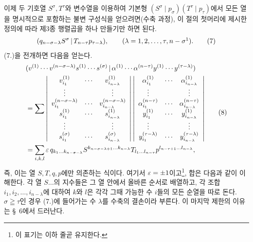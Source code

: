 이제 두 기호열 $S^\sigma,T^\tau$와 변수열을 이용하여 기본형 $(S^\sigma\mid p_\sigma)(T^\tau\mid p_\tau)$에서 모든 열을 명시적으로 포함하는 불변 구성식을 얻으려면(수축 과정), 이 절의 첫머리에 제시한 정의에 따라 제3종 행렬곱을 하나 만들기만 하면 된다.
\begin{equation}
 \pair{q_{n-\sigma-\lambda}S^\sigma}{T_{n-\tau}p_{\tau-\lambda}},
 \qquad (\lambda=1,2,\ldots,\tau,n-\sigma\footnotemark).
\tag{7}
\end{equation}
(7.)을 전개하면 다음을 얻는다.
\begingroup
\setlength{\arraycolsep}{2pt}
\begin{equation}
\begin{aligned}
&(v^{(1)}\cdots v^{(n-\sigma-\lambda)}s^{(1)}\cdots s^{(\sigma)}\,|\,\alpha^{(1)}\cdots\alpha^{(n-\tau)}y^{(1)}\cdots y^{(\tau-\lambda)}) \\
&=\sum
\left|\begin{array}{ccc}
 v_{i_1}^{(1)}&\cdots&v_{i_{n-\lambda}}^{(1)}\\
 \vdots&&\vdots\\
 v_{i_1}^{(n-\sigma-\lambda)}&\cdots&v_{i_{n-\lambda}}^{(n-\sigma-\lambda)}\\
 s_{i_1}^{(1)}&\cdots&s_{i_{n-\lambda}}^{(1)}\\
 \vdots&&\vdots\\
 s_{i_1}^{(\sigma)}&\cdots&s_{i_{n-\lambda}}^{(\sigma)}
\end{array}\right|
\left|\begin{array}{ccc}
 \alpha_{i_1}^{(1)}&\cdots&\alpha_{i_{n-\lambda}}^{(1)}\\
 \vdots&&\vdots\\
 \alpha_{i_1}^{(n-\tau)}&\cdots&\alpha_{i_{n-\lambda}}^{(n-\tau)}\\
 y_{i_1}^{(1)}&\cdots&y_{i_{n-\lambda}}^{(1)}\\
 \vdots&&\vdots\\
 y_{i_1}^{(\tau-\lambda)}&\cdots&y_{i_{n-\lambda}}^{(\tau-\lambda)}
\end{array}\right|\\
&=\sum_{i,k,l}\varepsilon\,q_{k_1\ldots k_{n-\sigma-\lambda}}
 S^{k_{n-\sigma-\lambda+1}\ldots k_{n-\lambda}}
 T_{l_1\ldots l_{n-\tau}}
 p^{l_{n-\tau+1}\ldots l_{n-\lambda}},
\end{aligned}
\tag{8}
\end{equation}
\endgroup
즉, 이는 열 $S,T,q,p$에만 의존하는 식이다. 여기서 $\varepsilon=\pm1$이고\footnote{이 표기는 이하 줄곧 유지한다.}, 합은 다음과 같이 이해한다. 각 열 $S\ldots$의 지수들은 그 열 안에서 올바른 순서로 배열하고, 각 조합 $i_1,i_2,\ldots,i_{n-\lambda}$에 대하여 $k$와 $l$은 각각 그때 가능한 수 $i$들의 모든 순열을 따로 돈다. $\sigma\geqq\tau$인 경우 (7.)에 들어가는 수 $\lambda$를 수축의 결손이라 부른다. 이 마지막 제한의 이유는 \S\ 6에서 드러난다.

